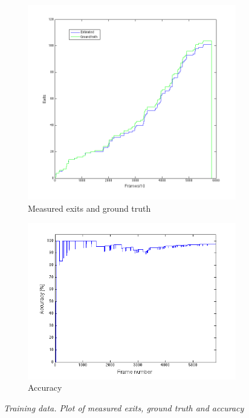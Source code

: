 \begin{figure}[H]
\centering
\begin{subfigure}{.5\textwidth}
  \centering
  \includegraphics[width=.8\linewidth]{images/ExitsTest.png}
  \caption{Measured exits and ground truth}
  \label{fig:sub1}
\end{subfigure}%
\begin{subfigure}{.5\textwidth}
  \centering
  \includegraphics[width=.8\linewidth]{images/AccExitsTest.png}
  \caption{Accuracy}
  \label{fig:sub2}
\end{subfigure}
\caption[Entries training]{\textit{Training data. Plot of measured exits, ground truth and accuracy}}
\label{fig:Exits Training data}
\end{figure}


